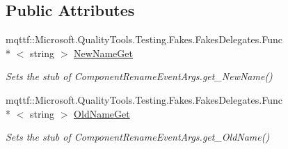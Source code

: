\subsection*{Public Attributes}
\begin{DoxyCompactItemize}
\item 
mqttf\-::\-Microsoft.\-Quality\-Tools.\-Testing.\-Fakes.\-Fakes\-Delegates.\-Func\\*
$<$ string $>$ \hyperlink{class_system_1_1_component_model_1_1_design_1_1_fakes_1_1_stub_component_rename_event_args_aa5ce70e30440931eef0167cf47731b16}{New\-Name\-Get}
\begin{DoxyCompactList}\small\item\em Sets the stub of Component\-Rename\-Event\-Args.\-get\-\_\-\-New\-Name()\end{DoxyCompactList}\item 
mqttf\-::\-Microsoft.\-Quality\-Tools.\-Testing.\-Fakes.\-Fakes\-Delegates.\-Func\\*
$<$ string $>$ \hyperlink{class_system_1_1_component_model_1_1_design_1_1_fakes_1_1_stub_component_rename_event_args_adc0491bb4b2f884c91b321ac331bea28}{Old\-Name\-Get}
\begin{DoxyCompactList}\small\item\em Sets the stub of Component\-Rename\-Event\-Args.\-get\-\_\-\-Old\-Name()\end{DoxyCompactList}\end{DoxyCompactItemize}
